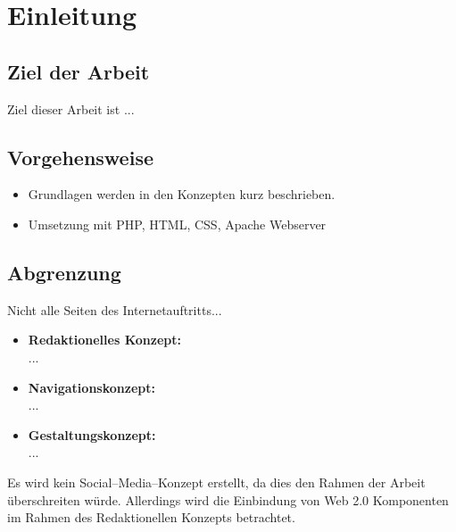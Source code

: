 \section{Einleitung}
\subsection{Ziel der Arbeit}

Ziel dieser Arbeit ist ...

\subsection{Vorgehensweise}


\begin{itemize}
	\item Grundlagen werden in den Konzepten kurz beschrieben.
	\item Umsetzung mit PHP, HTML, CSS, Apache Webserver
\end{itemize}


\subsection{Abgrenzung}

Nicht alle Seiten des Internetauftritts...

\begin{itemize}
	\item \textbf{Redaktionelles Konzept:}\\
	...
	\item \textbf{Navigationskonzept:}\\
	...
	\item \textbf{Gestaltungskonzept:}\\
	...

\end{itemize}

Es wird kein Social--Media--Konzept erstellt, da dies den Rahmen der Arbeit überschreiten würde. Allerdings wird die Einbindung von Web 2.0 Komponenten im Rahmen des Redaktionellen Konzepts betrachtet.